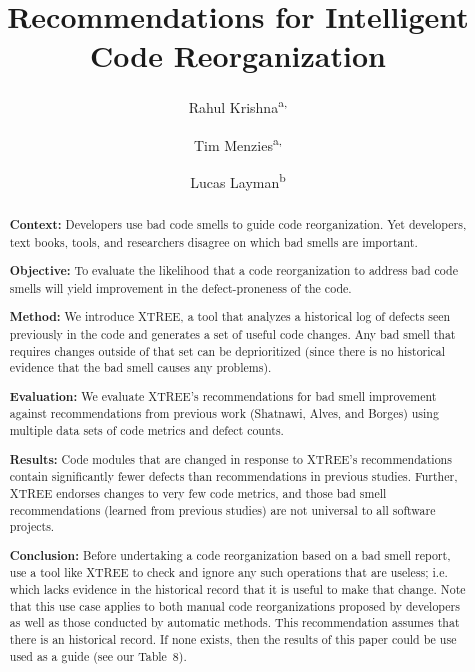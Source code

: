 \documentclass[twocolumn,5p]{elsarticle}
\theoremstyle{break}
\begin{document}
	
	\begin{frontmatter}
		
		\title{Recommendations for Intelligent Code Reorganization}
		
		\author{Rahul Krishna\textsuperscript{a,}}
		\author{Tim Menzies\textsuperscript{a,}}
		\author{Lucas Layman\textsuperscript{b}}
		\address{\textsuperscript{a}Department of Computer Science, North Carolina State University, Raleigh, NC, USA\\
			\textsuperscript{b}Fraunhofer CESE, College Park, USA}
		
		\begin{abstract} 
			{\bf Context: } 
			Developers use bad code smells to guide code reorganization.
			Yet developers, text books, tools, and researchers disagree on which bad smells are important.
			
			\noindent 
			{\bf Objective:} To evaluate the likelihood that a code reorganization to address bad code smells will yield improvement in the defect-proneness of the code.
			
			\noindent
			{\bf Method: } We introduce XTREE, a tool that analyzes a historical log of defects seen previously in the code and generates a set of useful code changes.
			Any bad smell that requires changes outside of that set can be deprioritized (since there is no historical evidence that the bad smell causes any problems).
			
			\noindent
			{\bf Evaluation: } We evaluate XTREE's recommendations for bad smell improvement against recommendations from previous work (Shatnawi, Alves, and Borges) using multiple data sets of code metrics and defect counts.  
			
			\noindent
			{\bf Results: }Code modules that are changed in response to XTREE's recommendations contain significantly fewer defects than recommendations in previous studies. Further, XTREE endorses changes to very few code metrics, and those bad smell recommendations (learned from previous studies) are not universal to all  software projects.
			
			\noindent
			{\bf Conclusion: }
			Before undertaking a code reorganization based on a bad smell report,
			use a tool like XTREE to check and ignore any such operations that  are useless; i.e. which lacks evidence
			in the historical record  that it is useful to make that change.
			Note that this use case applies to both manual code reorganizations proposed by developers
			as well as those conducted by automatic methods.
			This recommendation assumes that there is an historical record.
			If none exists, then the results of this paper could be use used as a guide (see our
			Table~8). 
			
			
		\end{abstract}
	\end{frontmatter}
\end{document}
